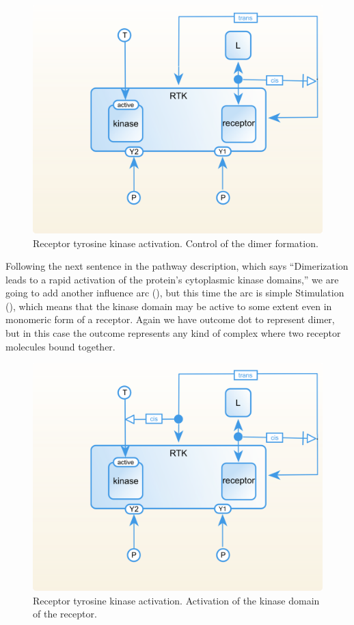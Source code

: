 \begin{figure}[H]
  \centering
  \vspace*{-0.75em}
  \includegraphics[scale=0.75]{examples/rtk-dimer-control.png}
   \caption{Receptor tyrosine kinase activation. Control of the dimer formation.}
  \label{fig:rtk-dimer-control}
\end{figure}

Following the next sentence in the pathway description, which says ``Dimerization leads to a rapid activation of the protein's cytoplasmic kinase domains,'' we are going to add another influence arc (), but this time the arc is simple Stimulation (), which means that the kinase domain may be active to some extent even in monomeric form of a receptor. Again we have outcome dot to represent dimer, but in this case the  outcome represents any kind of complex where two receptor molecules bound together.

\begin{figure}[H]
  \centering
  \vspace*{-0.75em}
  \includegraphics[scale=0.75]{examples/rtk-kinase-activation.png}
   \caption{Receptor tyrosine kinase activation. Activation of the kinase domain of the receptor.}
  \label{fig:rtk-kinase-activation}
\end{figure}

